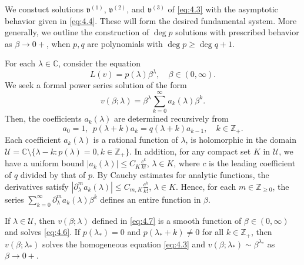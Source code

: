 \documentclass[11pt]{article}
\makeatletter
\renewenvironment{proof}[1][\proofname]{\par
  \vspace{-.7\topsep}%
  \pushQED{\qed}%
  \normalfont
  \topsep0pt \partopsep0pt %
  \trivlist
  \item[\hskip\labelsep
        \itshape
    #1\@addpunct{.}]\ignorespaces
}{%
  \popQED\endtrivlist\@endpefalse
  \addvspace{6pt plus 6pt} %
}
\theoremstyle{definition}
\theoremstyle{remark}
\numberwithin{equation}{section}
\newcommand{\mbb}{\mathbb}
\newcommand{\mcal}{\mathcal}
\newcommand{\mfrak}{\mathfrak}
\newcommand{\Z}{\mbb{Z}}
\newcommand{\C}{\mbb{C}}
\newcommand{\del}{\partial}
\newcommand{\upindex}[1]{^{(#1)}}
\makeatother
\begin{document}
\begin{proof}[Proof of Lemma \ref{lem:4.3}]
We constuct solutions $\mfrak{v}\upindex{1}$, $\mfrak{v}\upindex{2}$, and $\mfrak{v}\upindex{3}$ of \eqref{eq:4.3} with the asymptotic behavior given in \eqref{eq:4.4}. These will form the desired fundamental system. More generally, we outline the construction of $\deg p$ solutions with prescribed behavior as $\beta\to 0+$, when $p,q$ are polynomials with $\deg p \geq \deg q + 1$.

For each $\lambda\in\C$, consider the equation
\begin{equation} \label{eq:4.6}
L(v) = p(\lambda) \beta^\lambda, \quad \beta \in(0,\infty).
\end{equation}
We seek a formal power series solution of the form
\begin{equation} \label{eq:4.7}
v(\beta;\lambda) = \beta^\lambda \sum_{k=0}^\infty a_k(\lambda) \beta^k.
\end{equation}
Then, the coefficients $a_k(\lambda)$ are determined recursively from
\begin{equation} \label{eq:4.8}
a_0 = 1,~~ p(\lambda+k) a_k = q(\lambda+k)a_{k-1}, \quad k\in\Z_+.
\end{equation}
Each coefficient $a_k(\lambda)$ is a rational function of $\lambda$, is holomorphic in the domain $\mcal{U} = \C \setminus \{\lambda - k : p(\lambda) = 0, k\in\Z_+\}$. In addition, for any compact set $K$ in $\mcal{U}$, we have a uniform bound $|a_k (\lambda)| \leq C_{K} \frac{c^k}{k!}$, $\lambda\in K$, where $c$ is the leading coefficient of $q$ divided by that of $p$. By Cauchy estimates for analytic functions, the derivatives satisfy $|\del^m_\lambda a_k(\lambda)| \leq C_{m,K} \frac{c^k}{k!}$, $\lambda\in K$. Hence, for each $m\in \Z_{\geq 0}$, the series $\sum_{k=0}^\infty \del^m_\lambda a_k(\lambda) \beta^k$ defines an entire function in $\beta$.

If $\lambda\in \mcal{U}$, then $v(\beta;\lambda)$ defined in \eqref{eq:4.7} is a smooth function of $\beta\in(0,\infty)$ and solves \eqref{eq:4.6}. If $p(\lambda_*) = 0$ and $p(\lambda_* + k) \neq 0$ for all $k\in \Z_+$, then $v(\beta; \lambda_*)$ solves the homogeneous equation \eqref{eq:4.3} and $v(\beta;\lambda_*) \sim \beta^{\lambda_*}$ as $\beta \to 0+$.


\end{proof}
\end{document}
